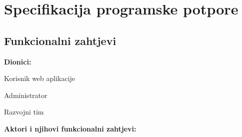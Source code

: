 \chapter{Specifikacija programske potpore}
		
	\section{Funkcionalni zahtjevi}
			
			
			
			\noindent \textbf{Dionici:}
			
			\begin{packed_enum}
				
				\item Korisnik web aplikacije
				\item Administrator
				\item Razvojni tim
				
			\end{packed_enum}
			
			\noindent \textbf{Aktori i njihovi funkcionalni zahtjevi:}
			
